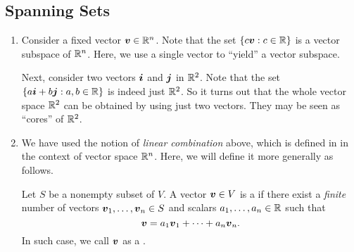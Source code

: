\subsection{Spanning Sets}
\begin{enumerate}
\item Consider a fixed vector \(\vb*{v}\in\mathbb{R}^n\). Note that the set
\(\{c\vb*{v}:c\in\mathbb{R}\}\) is a vector subspace of \(\mathbb{R}^n\). Here, we use a
single vector to ``yield''  a vector subspace.

Next, consider two vectors \(\vb*{i}\) and \(\vb*{j}\) in \(\mathbb{R}^2\). Note that
the set \(\{a\vb*{i}+b\vb*{j}:a,b\in\mathbb{R}\}\) is indeed just \(\mathbb{R}^2\). So it
turns out that the whole vector space \(\mathbb{R}^2\) can be obtained by using just
two vectors. They may be seen as ``cores'' of \(\mathbb{R}^2\).

\item We have used the notion of \emph{linear combination} above, which is
defined in  in the context of vector space \(\mathbb{R}^n\).
Here, we will define it more generally as follows.

Let \(S\) be a nonempty subset of \(V\). A vector \(\vb*{v}\in V\) is a
 if there exist a \emph{finite}
number of vectors \(\vb*{v}_1,\dotsc,\vb*{v}_{n}\in S\) and scalars
\(a_1,\dotsc,a_n\in\mathbb{R}\) such that
\[
\vb*{v}=a_1\vb*{v}_1+\dotsb+a_n\vb*{v}_n.
\]
In such case, we call \(\vb*{v}\) as a .


\end{enumerate}
